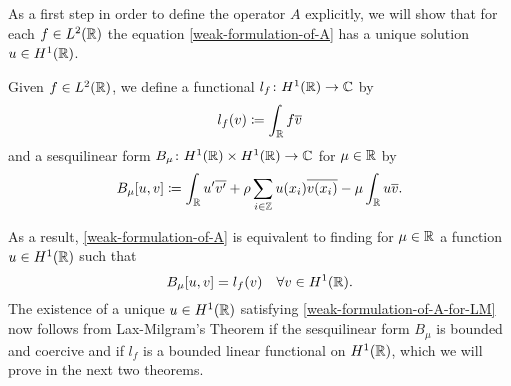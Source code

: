 As a first step in order to define the operator $A$ explicitly, we will show that for each $f \in L^{2}(\mathbb{R})$ the equation \eqref{weak-formulation-of-A} has a unique solution $u \in H^{1}(\mathbb{R})$. 
\begin{definition}
	Given $f \in L^{2}(\mathbb{R})$, we define a functional $l_{f} \colon H^{1}(\mathbb{R}) \rightarrow \mathbb{C}$ by
	\[ l_{f}(v) \coloneqq \int_{\mathbb{R}} f \overline{v} \]
and a sesquilinear form $B_{\mu} \colon H^{1}(\mathbb{R}) \times H^{1}(\mathbb{R}) \rightarrow \mathbb{C}$ for $\mu \in \mathbb{R}$ by
	\[ B_{\mu}[u, v] \coloneqq \int_{\mathbb{R}} u' \overline{v'} + \rho \sum_{i \in \mathbb{Z}} u(x_{i}) \overline{v(x_{i})} - \mu \int_{\mathbb{R}} u \overline{v}. \]
\end{definition}
As a result, \eqref{weak-formulation-of-A} is equivalent to finding for $\mu \in \mathbb{R}$ a function $u \in H^{1}(\mathbb{R})$ such that
	\begin{equation}
		B_{\mu}[u, v] =  l_{f}(v) \quad \forall v \in H^{1}(\mathbb{R}). \label{weak-formulation-of-A-for-LM}
	\end{equation}
The existence of a unique $u \in H^{1}(\mathbb{R})$ satisfying \eqref{weak-formulation-of-A-for-LM} now follows from Lax-Milgram's Theorem if the sesquilinear form $B_{\mu}$ is bounded and coercive and if $l_{f}$ is a bounded linear functional on $H^{1}(\mathbb{R})$, which we will prove in the next two theorems.

